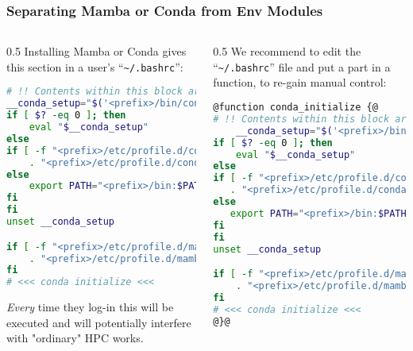 \begin{frame}[fragile]
  \frametitle{Separating Mamba or Conda from Env Modules}
  \footnotesize
  \begin{columns}[t]
    \begin{column}{0.5\textwidth}
       Installing Mamba or Conda gives this section in a user's ``\texttt{\textasciitilde/.bashrc}'':
       \begin{lstlisting}[language=Bash, style=Shell, basicstyle=\tiny, breaklines=true]
# !! Contents within this block are managed by 'conda init' !!
__conda_setup="$('<prefix>/bin/conda' 'shell.bash' 'hook' 2> /dev/null)"
if [ $? -eq 0 ]; then
    eval "$__conda_setup"
else
if [ -f "<prefix>/etc/profile.d/conda.sh" ]; then
    . "<prefix>/etc/profile.d/conda.sh"
else
    export PATH="<prefix>/bin:$PATH"
fi
fi
unset __conda_setup

if [ -f "<prefix>/etc/profile.d/mamba.sh" ]; then
    . "<prefix>/etc/profile.d/mamba.sh"
fi
# <<< conda initialize <<<
      \end{lstlisting}
      \bcattention \emph{Every} time they log-in this will be executed and will potentially interfere with "ordinary" HPC works.
    \end{column}
    \begin{column}{0.5\textwidth}
       \pause
       {\footnotesize We recommend to edit the ``\texttt{\textasciitilde/.bashrc}'' file and put a part in a function, to re-gain manual control:}
       \begin{lstlisting}[language=Bash, style=Shell, basicstyle=\tiny, breaklines=true]
@function conda_initialize {@
# !! Contents within this block are managed by 'conda init' !!
    __conda_setup="$('<prefix>/bin/conda' 'shell.bash' 'hook' 2> /dev/null)"
if [ $? -eq 0 ]; then
    eval "$__conda_setup"
else
if [ -f "<prefix>/etc/profile.d/conda.sh" ]; then
   . "<prefix>/etc/profile.d/conda.sh"
else
   export PATH="<prefix>/bin:$PATH"
fi
fi
unset __conda_setup

if [ -f "<prefix>/etc/profile.d/mamba.sh" ]; then 
    . "<prefix>/etc/profile.d/mamba.sh"
fi
# <<< conda initialize <<<
@}@
      \end{lstlisting}
    \end{column}
  \end{columns}
\end{frame}


